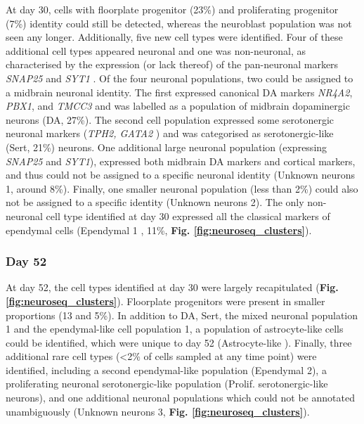 At day 30, cells with floorplate progenitor (23\%) and proliferating progenitor (7\%) identity could still be detected, whereas the neuroblast population was not seen any longer.
Additionally, five new cell types were identified.
Four of these additional cell types appeared neuronal and one was non-neuronal, as characterised by the expression (or lack thereof) of the pan-neuronal markers \textit{SNAP25} and \textit{SYT1} \cite{arenas2015make}.
Of the four neuronal populations, two could be assigned to a midbrain neuronal identity.
The first expressed canonical DA markers \textit{NR4A2}, \textit{PBX1}, and \textit{TMCC3} \cite{la2016molecular, park2006acquisition, ramonet2012park9} and was labelled as a population of midbrain dopaminergic neurons (DA, 27\%).
The second cell population expressed some serotonergic neuronal markers (\textit{TPH2, GATA2} \cite{cummings2019serotonergic}) and was categorised as serotonergic-like (Sert, 21\%) neurons. 
One additional large neuronal population (expressing \textit{SNAP25} and \textit{SYT1}), expressed both midbrain DA markers and cortical markers, and thus could not be assigned to a specific neuronal identity (Unknown neurons 1, around 8\%).
Finally, one smaller neuronal population (less than 2\%) could also not be assigned to a specific identity (Unknown neurons 2). 
The only non-neuronal cell type identified at day 30 expressed all the classical markers of ependymal cells (Ependymal 1 \cite{campbell2017molecular}, 11\%,\textbf{ Fig. \ref{fig:neuroseq_clusters}}). 

\subsubsection{Day 52}

At day 52, the cell types identified at day 30 were largely recapitulated (\textbf{Fig. \ref{fig:neuroseq_clusters}}).
Floorplate progenitors were present in smaller proportions (13 and 5\%).
In addition to DA, Sert, the mixed neuronal population 1 and the ependymal-like cell population 1, a population of astrocyte-like cells could be identified, which were unique to day 52 (Astrocyte-like \cite{sloan2017human, zhang2016purification}). 
Finally, three additional rare cell types (<2\% of cells sampled at any time point) were identified, including a second ependymal-like population (Ependymal 2), a proliferating neuronal serotonergic-like population (Prolif. serotonergic-like neurons), and one additional neuronal populations which could not be annotated unambiguously (Unknown neurons 3, \textbf{Fig. \ref{fig:neuroseq_clusters}}). \\

